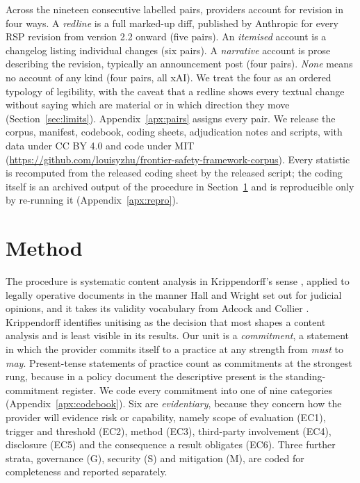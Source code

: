 \documentclass{article}
\begin{document}
Across the nineteen consecutive labelled pairs, providers account for revision in four ways. A \emph{redline} is a full marked-up diff, published by Anthropic for every RSP revision from version 2.2 onward (five pairs). An \emph{itemised} account is a changelog listing individual changes (six pairs). A \emph{narrative} account is prose describing the revision, typically an announcement post (four pairs). \emph{None} means no account of any kind (four pairs, all xAI). We treat the four as an ordered typology of legibility, with the caveat that a redline shows every textual change without saying which are material or in which direction they move (Section~\ref{sec:limits}). Appendix~\ref{apx:pairs} assigns every pair. We release the corpus, manifest, codebook, coding sheets, adjudication notes and scripts, with data under CC BY 4.0 and code under MIT (\url{https://github.com/louisyzhu/frontier-safety-framework-corpus}). Every statistic is recomputed from the released coding sheet by the released script; the coding itself is an archived output of the procedure in Section~\ref{sec:method} and is reproducible only by re-running it (Appendix~\ref{apx:repro}).

\section{Method}
\label{sec:method}

The procedure is systematic content analysis in Krippendorff's sense \citep{krippendorff2019content}, applied to legally operative documents in the manner Hall and Wright \citep{hall2008systematic} set out for judicial opinions, and it takes its validity vocabulary from Adcock and Collier \citep{adcock2001measurement}. Krippendorff identifies unitising as the decision that most shapes a content analysis and is least visible in its results. Our unit is a \emph{commitment}, a statement in which the provider commits itself to a practice at any strength from \emph{must} to \emph{may}. Present-tense statements of practice count as commitments at the strongest rung, because in a policy document the descriptive present is the standing-commitment register. We code every commitment into one of nine categories (Appendix~\ref{apx:codebook}). Six are \emph{evidentiary}, because they concern how the provider will evidence risk or capability, namely scope of evaluation (EC1), trigger and threshold (EC2), method (EC3), third-party involvement (EC4), disclosure (EC5) and the consequence a result obligates (EC6). Three further strata, governance (G), security (S) and mitigation (M), are coded for completeness and reported separately.
\end{document}
